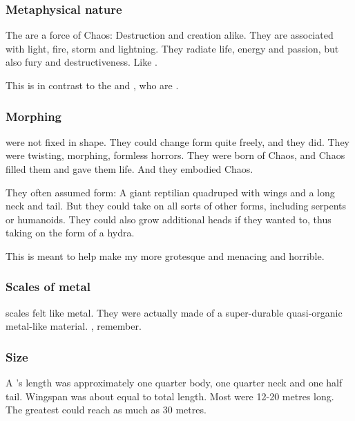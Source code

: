 \subsubsection{Metaphysical nature}
The \dragons{} are a force of Chaos: Destruction and creation alike. 
They are associated with light, fire, storm and lightning. 
They radiate life, energy and passion, but also fury and destructiveness. 
Like . 

This is in contrast to the \banes{} and \resphain, who are . 





\subsubsection{Morphing}
\Dragons were not fixed in shape.
They could change form quite freely, and they did.
They were twisting, morphing, formless horrors. 
They were born of Chaos, and Chaos filled them and gave them life. 
And they embodied Chaos. 

They often assumed  \draconian form: 
A giant reptilian quadruped with wings and a long neck and tail. 
But they could take on all sorts of other forms, including serpents or humanoids. 
They could also grow additional heads if they wanted to, thus taking on the form of a hydra. 

This is meant to help make my \dragons more grotesque and menacing and horrible. 





\subsubsection{Scales of metal}
\Draconic scales felt like metal. 
They were actually made of a super-durable quasi-organic metal-like material.
, remember. 





\subsubsection{Size}
A \dragon's length was approximately one quarter body, one quarter neck and one half tail.
Wingspan was about equal to total length.
Most \dragons were 12-20 metres long. 
The greatest \dragons could reach as much as 30 metres. 

